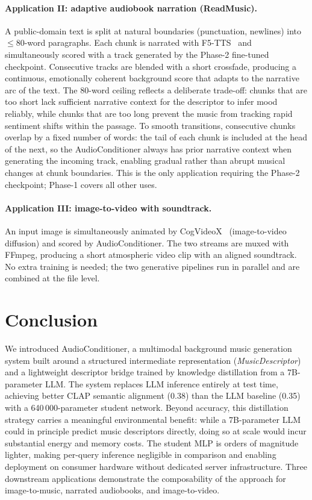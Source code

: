 \documentclass[10pt,twocolumn,letterpaper]{article}
\begin{document}
\paragraph{Application II: adaptive audiobook narration (ReadMusic).}
A public-domain text is split at natural boundaries (punctuation, newlines) into
${\le}80$-word paragraphs.
Each chunk is narrated with F5-TTS~\cite{chen2024f5tts} and simultaneously
scored with a track generated by the Phase-2 fine-tuned checkpoint.
Consecutive tracks are blended with a short crossfade, producing a continuous,
emotionally coherent background score that adapts to the narrative arc of the
text.
The 80-word ceiling reflects a deliberate trade-off: chunks that are too short
lack sufficient narrative context for the descriptor to infer mood reliably,
while chunks that are too long prevent the music from tracking rapid sentiment
shifts within the passage.
To smooth transitions, consecutive chunks overlap by a fixed number of words:
the tail of each chunk is included at the head of the next, so the
AudioConditioner always has prior narrative context when generating the
incoming track, enabling gradual rather than abrupt musical changes at
chunk boundaries.
This is the only application requiring the Phase-2 checkpoint; Phase-1
covers all other uses.

\paragraph{Application III: image-to-video with soundtrack.}
An input image is simultaneously animated by CogVideoX~\cite{yang2024cogvideox}
(image-to-video diffusion) and scored by AudioConditioner.
The two streams are muxed with FFmpeg, producing a short atmospheric video
clip with an aligned soundtrack.
No extra training is needed; the two generative pipelines run in parallel and
are combined at the file level.

\section{Conclusion}
\label{sec:conclusion}

We introduced AudioConditioner, a multimodal background music generation
system built around a structured intermediate representation
(\emph{MusicDescriptor}) and a lightweight descriptor bridge trained by
knowledge distillation from a 7B-parameter LLM.
The system replaces LLM inference entirely at test time, achieving better
CLAP semantic alignment (0.38) than the LLM baseline (0.35) with a
640\,000-parameter student network.
Beyond accuracy, this distillation strategy carries a meaningful environmental
benefit: while a 7B-parameter LLM could in principle predict music descriptors
directly, doing so at scale would incur substantial energy and memory costs.
The student MLP is orders of magnitude lighter, making per-query inference
negligible in comparison and enabling deployment on consumer hardware without
dedicated server infrastructure.
Three downstream applications demonstrate the composability of the approach
for image-to-music, narrated audiobooks, and image-to-video.
\end{document}
